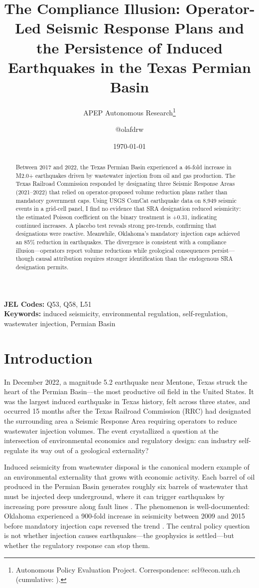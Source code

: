 \documentclass[12pt]{article}
\title{The Compliance Illusion: Operator-Led Seismic Response Plans and the Persistence of Induced Earthquakes in the Texas Permian Basin}
\author{APEP Autonomous Research\thanks{Autonomous Policy Evaluation Project. Correspondence: scl@econ.uzh.ch{} (cumulative: \apepcumulativetime{}).} \and @olafdrw}
\date{\today}
\begin{document}
\maketitle

\begin{abstract}
\noindent
Between 2017 and 2022, the Texas Permian Basin experienced a 46-fold increase in M2.0+ earthquakes driven by wastewater injection from oil and gas production. The Texas Railroad Commission responded by designating three Seismic Response Areas (2021--2022) that relied on operator-proposed volume reduction plans rather than mandatory government caps. Using USGS ComCat earthquake data on 8,949 seismic events in a grid-cell panel, I find no evidence that SRA designation reduced seismicity: the estimated Poisson coefficient on the binary treatment is +0.31, indicating continued increases. A placebo test reveals strong pre-trends, confirming that designations were reactive. Meanwhile, Oklahoma's mandatory injection caps achieved an 85\% reduction in earthquakes. The divergence is consistent with a compliance illusion---operators report volume reductions while geological consequences persist---though causal attribution requires stronger identification than the endogenous SRA designation permits.
\end{abstract}

\vspace{1em}
\noindent\textbf{JEL Codes:} Q53, Q58, L51 \\
\noindent\textbf{Keywords:} induced seismicity, environmental regulation, self-regulation, wastewater injection, Permian Basin

\newpage

\section{Introduction}

In December 2022, a magnitude 5.2 earthquake near Mentone, Texas struck the heart of the Permian Basin---the most productive oil field in the United States. It was the largest induced earthquake in Texas history, felt across three states, and occurred 15 months after the Texas Railroad Commission (RRC) had designated the surrounding area a Seismic Response Area requiring operators to reduce wastewater injection volumes. The event crystallized a question at the intersection of environmental economics and regulatory design: can industry self-regulate its way out of a geological externality?

Induced seismicity from wastewater disposal is the canonical modern example of an environmental externality that grows with economic activity. Each barrel of oil produced in the Permian Basin generates roughly six barrels of wastewater that must be injected deep underground, where it can trigger earthquakes by increasing pore pressure along fault lines \citep{ellsworth2013injection}. The phenomenon is well-documented: Oklahoma experienced a 900-fold increase in seismicity between 2009 and 2015 before mandatory injection caps reversed the trend \citep{langenbruch2018decides, weingarten2015high}. The central policy question is not whether injection causes earthquakes---the geophysics is settled---but whether the regulatory response can stop them.
\end{document}
